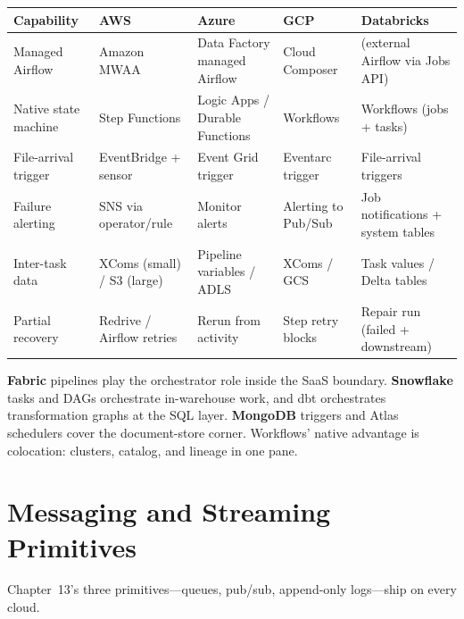 \begin{center}
\footnotesize
\begin{tabular}{@{}p{2.4cm}p{2.9cm}p{2.9cm}p{2.9cm}p{2.9cm}@{}}
\toprule
\textbf{Capability} & \textbf{AWS} & \textbf{Azure} & \textbf{GCP} & \textbf{Databricks} \\
\midrule
Managed Airflow & Amazon MWAA & Data Factory managed Airflow & Cloud Composer & (external Airflow via Jobs API) \\
Native state machine & Step Functions & Logic Apps / Durable Functions & Workflows & Workflows (jobs + tasks) \\
File-arrival trigger & EventBridge + sensor & Event Grid trigger & Eventarc trigger & File-arrival triggers \\
Failure alerting & SNS via operator/rule & Monitor alerts & Alerting to Pub/Sub & Job notifications + system tables \\
\addlinespace
Inter-task data & XComs (small) / S3 (large) & Pipeline variables / ADLS & XComs / GCS & Task values / Delta tables \\
Partial recovery & Redrive / Airflow retries & Rerun from activity & Step retry blocks & Repair run (failed + downstream) \\
\bottomrule
\end{tabular}
\end{center}

\noindent \textbf{Fabric} pipelines play the orchestrator role inside the SaaS boundary.
\textbf{Snowflake} tasks and DAGs orchestrate in-warehouse work, and dbt orchestrates
transformation graphs at the SQL layer. \textbf{MongoDB} triggers and Atlas schedulers cover the
document-store corner. Workflows' native advantage is colocation: clusters, catalog, and lineage
in one pane.

\section{Messaging and Streaming Primitives}
%
Chapter~13's three primitives---queues, pub/sub, append-only logs---ship on every cloud.

